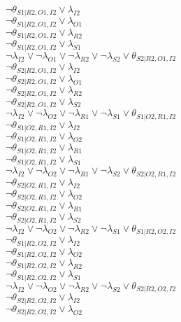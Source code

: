 $\neg\theta_{S1|R2,O1,I2} \vee \lambda_{I2}$\\
$\neg\theta_{S1|R2,O1,I2} \vee \lambda_{O1}$\\
$\neg\theta_{S1|R2,O1,I2} \vee \lambda_{R2}$\\
$\neg\theta_{S1|R2,O1,I2} \vee \lambda_{S1}$\\
$\neg\lambda_{I2} \vee \neg\lambda_{O1} \vee \neg\lambda_{R2} \vee \neg\lambda_{S2} \vee \theta_{S2|R2,O1,I2}$\\
$\neg\theta_{S2|R2,O1,I2} \vee \lambda_{I2}$\\
$\neg\theta_{S2|R2,O1,I2} \vee \lambda_{O1}$\\
$\neg\theta_{S2|R2,O1,I2} \vee \lambda_{R2}$\\
$\neg\theta_{S2|R2,O1,I2} \vee \lambda_{S2}$\\
$\neg\lambda_{I2} \vee \neg\lambda_{O2} \vee \neg\lambda_{R1} \vee \neg\lambda_{S1} \vee \theta_{S1|O2,R1,I2}$\\
$\neg\theta_{S1|O2,R1,I2} \vee \lambda_{I2}$\\
$\neg\theta_{S1|O2,R1,I2} \vee \lambda_{O2}$\\
$\neg\theta_{S1|O2,R1,I2} \vee \lambda_{R1}$\\
$\neg\theta_{S1|O2,R1,I2} \vee \lambda_{S1}$\\
$\neg\lambda_{I2} \vee \neg\lambda_{O2} \vee \neg\lambda_{R1} \vee \neg\lambda_{S2} \vee \theta_{S2|O2,R1,I2}$\\
$\neg\theta_{S2|O2,R1,I2} \vee \lambda_{I2}$\\
$\neg\theta_{S2|O2,R1,I2} \vee \lambda_{O2}$\\
$\neg\theta_{S2|O2,R1,I2} \vee \lambda_{R1}$\\
$\neg\theta_{S2|O2,R1,I2} \vee \lambda_{S2}$\\
$\neg\lambda_{I2} \vee \neg\lambda_{O2} \vee \neg\lambda_{R2} \vee \neg\lambda_{S1} \vee \theta_{S1|R2,O2,I2}$\\
$\neg\theta_{S1|R2,O2,I2} \vee \lambda_{I2}$\\
$\neg\theta_{S1|R2,O2,I2} \vee \lambda_{O2}$\\
$\neg\theta_{S1|R2,O2,I2} \vee \lambda_{R2}$\\
$\neg\theta_{S1|R2,O2,I2} \vee \lambda_{S1}$\\
$\neg\lambda_{I2} \vee \neg\lambda_{O2} \vee \neg\lambda_{R2} \vee \neg\lambda_{S2} \vee \theta_{S2|R2,O2,I2}$\\
$\neg\theta_{S2|R2,O2,I2} \vee \lambda_{I2}$\\
$\neg\theta_{S2|R2,O2,I2} \vee \lambda_{O2}$\\
